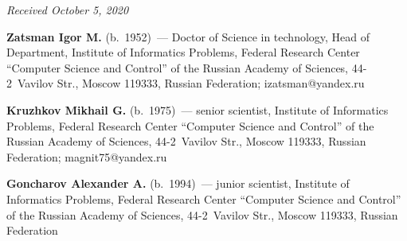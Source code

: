 \vspace*{-9pt}

\hfill{\small\textit{Received October 5, 2020}}



\Contr

\noindent
\textbf{Zatsman Igor M.} (b.\ 1952)~--- Doctor of Science in technology, Head of Department, Institute of 
Informatics Problems, Federal Research Center ``Computer Science and Control'' of the Russian Academy 
of Sciences, 44-2~Vavilov Str., Moscow 119333, Russian Federation; \mbox{izatsman@yandex.ru}

\vspace*{6pt}

\noindent
\textbf{Kruzhkov Mikhail G.} (b.\ 1975)~--- senior scientist, Institute of Informatics Problems, Federal 
Research Center ``Computer Science and Control'' of the Russian Academy of Sciences, 44-2~Vavilov Str., 
Moscow 119333, Russian Federation; \mbox{magnit75@yandex.ru}

\vspace*{6pt}

\noindent
\textbf{Goncharov Alexander A.} (b.\ 1994)~--- junior scientist, Institute of Informatics Problems, Federal 
Research Center ``Computer Science and Control'' of the Russian Academy of Sciences, 44-2~Vavilov Str., 
Moscow 119333, Russian Federation
\label{end\stat}

\renewcommand{\bibname}{\protect\rm Литература} 
      